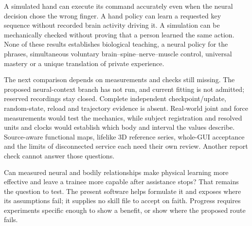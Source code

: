 A simulated hand can execute its command accurately even when the neural
decision chose the wrong finger. A hand policy can learn a requested key
sequence without recorded brain activity driving it. A simulation can be
mechanically checked without proving that a person learned the same action.
None of these results establishes biological teaching, a neural policy for the
phrases, simultaneous voluntary brain--spine--nerve--muscle control, universal
mastery or a unique translation of private experience.

The next comparison depends on measurements and checks still missing. The
proposed neural-context branch has not run, and current fitting is not admitted;
reserved recordings stay closed. Complete independent checkpoint/update,
random-state, reload and trajectory evidence is absent. Real-world joint and
force measurements would test the mechanics, while subject registration and
resolved units and clocks would establish which body and interval the values
describe. Source-aware functional maps, lifelike 3D reference series, whole-GUI
acceptance and the limits of disconnected service each need their own review.
Another report check cannot answer those questions.

Can measured neural and bodily relationships make physical learning more
effective and leave a trainee more capable after assistance stops? That remains
the question to test. The present software helps formulate it and exposes where
its assumptions fail; it supplies no skill file to accept on faith. Progress
requires experiments specific enough to show a benefit, or show where the
proposed route fails.


